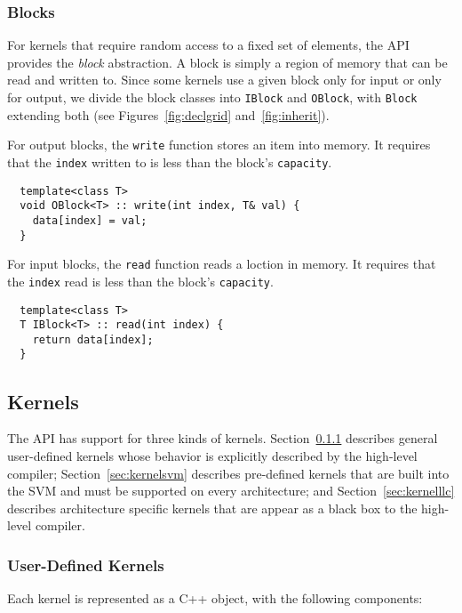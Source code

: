 \subsubsection{Blocks}
\label{sec:blocks}

For kernels that require random access to a fixed set of elements, the
API provides the {\it block} abstraction.  A block is simply a region
of memory that can be read and written to.  Since some kernels use a
given block only for input or only for output, we divide the block
classes into {\tt IBlock} and {\tt OBlock}, with {\tt Block} extending
both (see Figures~\ref{fig:declgrid} and~\ref{fig:inherit}).

 For output blocks, the {\tt write} function stores an
item into memory.  It requires that the {\tt index} written to is less
than the block's {\tt capacity}.  
{\small
\begin{verbatim}
  template<class T>
  void OBlock<T> :: write(int index, T& val) {
    data[index] = val;
  }
\end{verbatim}}

 For input blocks, the {\tt read} function reads a loction
in memory.  It requires that the {\tt index} read is less than the
block's {\tt capacity}.
{\small
\begin{verbatim}
  template<class T>
  T IBlock<T> :: read(int index) {
    return data[index];
  }
\end{verbatim}}

\subsection{Kernels}
\label{sec:kernel}

The API has support for three kinds of kernels.
Section~\ref{sec:kernelhlc} describes general user-defined kernels
whose behavior is explicitly described by the high-level compiler;
Section~\ref{sec:kernelsvm} describes pre-defined kernels that are
built into the SVM and must be supported on every architecture; and
Section~\ref{sec:kernelllc} describes architecture specific kernels
that are appear as a black box to the high-level compiler.

\subsubsection{User-Defined Kernels}
\label{sec:kernelhlc}


Each kernel is represented as a C++ object, with the following
components:

